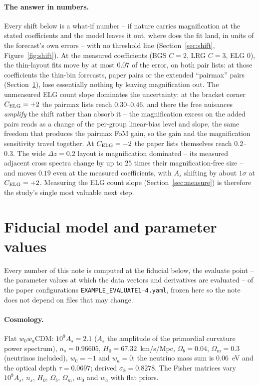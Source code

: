 \documentclass[11pt]{article}
\newcommand{\us}{\_\allowbreak}
\begin{document}
\paragraph{The answer in numbers.}
Every shift below is a what-if number -- if nature carries
magnification at the stated coefficients and the model leaves it out,
where does the fit land, in units of the forecast's own errors --
with no threshold line (Section~\ref{sec:shift},
Figure~\ref{fig:shift}).  At the measured coefficients (BGS $C = 2$,
LRG $C = 3$, ELG $0$), the thin-layout fits move by at most $0.07$ of
the error, on both pair lists: at those coefficients the thin-bin
forecasts, paper pairs or the extended ``pairmax'' pairs
(Section~\ref{sec:fiducial}), lose essentially nothing by
leaving magnification out.  The unmeasured ELG count slope dominates
the uncertainty: at the bracket corner $C_{\rm ELG} = +2$ the pairmax
lists reach $0.30$--$0.46$, and there the free nuisances
\emph{amplify} the shift rather than absorb it -- the magnification
excess on the added pairs reads as a change of the per-group
linear-bias level and slope, the same freedom that produces the
pairmax FoM gain, so the gain and the magnification sensitivity
travel together.  At $C_{\rm ELG} = -2$ the paper lists themselves
reach $0.2$--$0.3$.  The wide $\Delta z = 0.2$ layout is
magnification dominated -- its measured adjacent cross spectra change
by up to $25$ times their magnification-free size -- and moves
$0.19$ even at the measured
coefficients, with $A_s$ shifting by about $1\sigma$ at
$C_{\rm ELG} = +2$.  Measuring the ELG count slope
(Section~\ref{sec:measure}) is therefore the study's single most
valuable next step.

\section{Fiducial model and parameter values}
\label{sec:fiducial}

Every number of this note is computed at the fiducial below, the
evaluate point -- the parameter values at which the data vectors and
derivatives are evaluated -- of the paper configurations
\texttt{EXAMPLE\us EVALUATE1}--\texttt{4.yaml}, frozen here so the
note does not depend on files that may change.

\paragraph{Cosmology.}
Flat $w_0 w_a$CDM: $10^9 A_s = 2.1$ ($A_s$ the amplitude of the
primordial curvature power spectrum), $n_s = 0.96605$,
$H_0 = 67.32$~km/s/Mpc, $\Omega_b = 0.04$, $\Omega_m = 0.3$ (neutrinos
included), $w_0 = -1$ and $w_a = 0$; the neutrino mass sum is
$0.06$~eV and the optical depth $\tau = 0.0697$; derived
$\sigma_8 = 0.8278$.  The Fisher matrices vary $10^9 A_s$, $n_s$,
$H_0$, $\Omega_b$, $\Omega_m$, $w_0$ and $w_a$ with flat priors.
\end{document}
